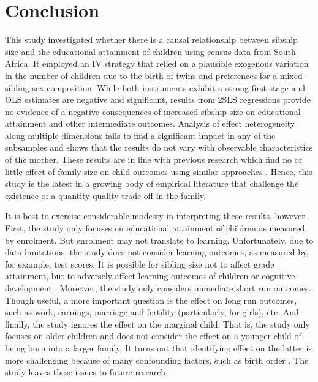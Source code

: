 \section{Conclusion}

This study investigated whether there is a causal relationship between sibship size and the educational attainment of children using census data from South Africa. It employed an IV strategy that relied on a plausible exogenous variation in the number of children due to the birth of twins and preferences for a mixed-sibling sex composition. While both instruments exhibit a strong first-stage and OLS estimates are negative and significant, results from 2SLS regressions provide no evidence of a negative consequences of increased sibship size on educational attainment and other intermediate outcomes. Analysis of effect heterogeneity along multiple dimensions fails to find a significant impact in any of the subsamples and shows that the results do not vary with observable characteristics of the mother. These results are in line with previous research which find no or little effect of family size on child outcomes using similar approaches \parencite[e.g.,][]{Black2005,Black2010,caceres-delpiano_impacts_2006,angrist_multiple_2010,bhalotra_twin_2020}. Hence, this study is the latest in a growing body of empirical literature that challenge the existence of a quantity-quality trade-off in the family.

It is best to exercise considerable modesty in interpreting these results, however. First, the study only focuses on educational attainment of children as measured by enrolment. But enrolment may not translate to learning. Unfortunately, due to data limitations, the study does not consider learning outcomes, as measured by, for example, test scores. It is possible for sibling size not to affect grade attainment, but to adversely affect learning outcomes of children or cognitive development \parencite{Black2010}. Moreover, the study only considers immediate short run outcomes. Though useful, a more important question is the effect on long run outcomes, such as work, earnings, marriage and fertility (particularly, for girls), etc. And finally, the study ignores the effect on the marginal child. That is, the study only focuses on older children and does not consider the effect on a younger child of being born into a larger family. It turns out that identifying effect on the latter is more challenging because of many confounding factors, such as birth order \parencite{Black2005}. The study leaves these issues to future research.  












